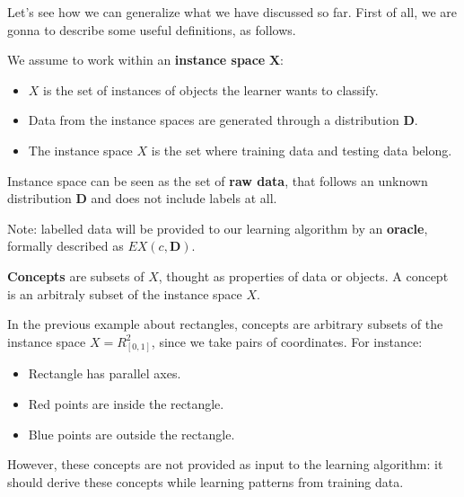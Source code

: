 Let's see how we can generalize what we have discussed so far. First of all, we are gonna to describe some useful definitions, as follows.
\begin{definition}[title = Instance Space $X$]
    We assume to work within an \textbf{instance space} $\boldsymbol{X}$:
    \begin{itemize}
        \renewcommand{\labelitemi}{-}
        \item $X$ is the set of instances of objects the learner wants to classify.
        \item Data from the instance spaces are generated through a distribution $\boldsymbol{D}$.
        \item The instance space $X$ is the set where training data and testing data belong.
    \end{itemize} \vspace{7pt}

    Instance space can be seen as the set of \textbf{raw data}, that follows an unknown distribution $\boldsymbol{D}$ and does not include labels at all. \vspace{7pt}

    Note: labelled data will be provided to our learning algorithm by an \textbf{oracle}, formally described as $EX(c, \boldsymbol{D})$.
\end{definition} 
\begin{definition}[title = Concept]
    \textbf{Concepts} are subsets of $X$, thought as properties of data or objects. A concept is an arbitraly subset of the instance space $X$. \vspace{7pt}

    In the previous example about rectangles, concepts are arbitrary subsets of the instance space $X = R^{2}_{[0,1]}$, since we take pairs of coordinates. For 
    instance:
    \begin{itemize}
        \renewcommand{\labelitemi}{-}
        \item Rectangle has parallel axes.
        \item Red points are inside the rectangle.
        \item Blue points are outside the rectangle.
    \end{itemize}
    However, these concepts are not provided as input to the learning algorithm: it should derive these concepts while learning patterns from training data.
\end{definition}
